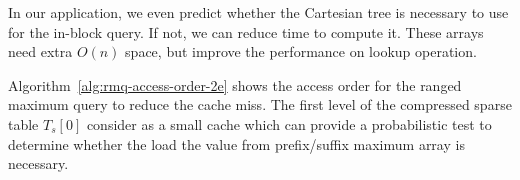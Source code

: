 In our application, we even predict whether the Cartesian tree is
necessary to use for the in-block query. If not, we can reduce time to
compute it. These arrays need extra $O(n)$ space, but improve the
performance on lookup operation.

Algorithm~\ref{alg:rmq-access-order-2e} shows the access order for the
ranged maximum query to reduce the cache miss.  The first level of the
compressed sparse table $T_s[0]$ consider as a small cache which can
provide a probabilistic test to determine whether the load the value
from prefix/suffix maximum array is necessary.



